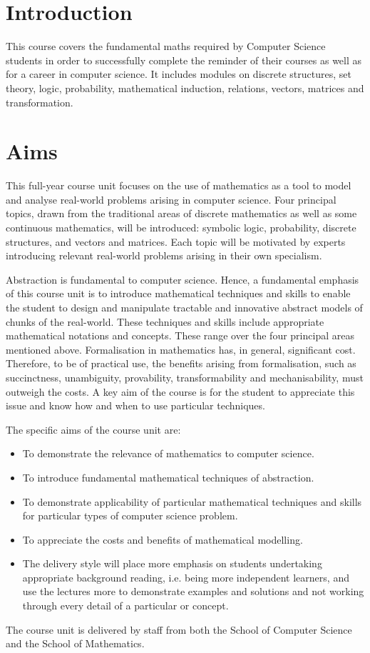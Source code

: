 \section*{Introduction}

This course covers the fundamental maths required by Computer Science students
in order to successfully complete the reminder of their courses as well as for a
career in computer science. It includes modules on discrete structures, set
theory, logic, probability, mathematical induction, relations, vectors, matrices
and transformation.

\section*{Aims}

This full-year course unit focuses on the use of mathematics as a tool to model
and analyse real-world problems arising in computer science. Four principal
topics, drawn from the traditional areas of discrete mathematics as well as some
continuous mathematics, will be introduced: symbolic logic, probability,
discrete structures, and vectors and matrices. Each topic will be motivated by
experts introducing relevant real-world problems arising in their own
specialism.

Abstraction is fundamental to computer science. Hence, a fundamental emphasis of
this course unit is to introduce mathematical techniques and skills to enable
the student to design and manipulate tractable and innovative abstract models of
chunks of the real-world. These techniques and skills include appropriate
mathematical notations and concepts. These range over the four principal areas
mentioned above. Formalisation in mathematics has, in general, significant cost.
Therefore, to be of practical use, the benefits arising from formalisation, such
as succinctness, unambiguity, provability, transformability and mechanisability,
must outweigh the costs. A key aim of the course is for the student to
appreciate this issue and know how and when to use particular techniques.

The specific aims of the course unit are:

\begin{itemize}
	\item To demonstrate the relevance of mathematics to computer science.
	\item To introduce fundamental mathematical techniques of abstraction.
	\item To demonstrate applicability of particular mathematical techniques and
		  skills for particular types of computer science problem.
	\item To appreciate the costs and benefits of mathematical modelling.
	\item The delivery style will place more emphasis on students undertaking
	      appropriate background reading, i.e. being more independent learners,
	      and use the lectures more to demonstrate examples and solutions and
	      not working through every detail of a particular or concept.
\end{itemize}

The course unit is delivered by staff from both the School of Computer Science
and the School of Mathematics.